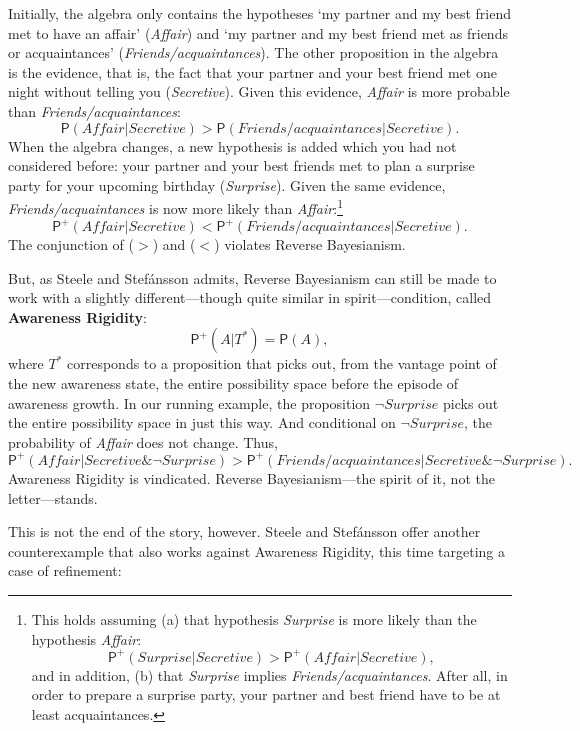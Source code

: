 \documentclass[
  11pt,
  dvipsnames,enabledeprecatedfontcommands]{scrartcl}
\newcommand{\pr}[1]{\ensuremath{\mathsf{P}(#1)}}
\newcommand{\ppr}[2]{\ensuremath{\mathsf{P}^{#1}(#2)}}
\begin{document}
\noindent Initially, the algebra only contains the hypotheses `my
partner and my best friend met to have an affair' (\textit{Affair}) and
`my partner and my best friend met as friends or acquaintances'
(\textit{Friends/acquaintances}). The other proposition in the algebra
is the evidence, that is, the fact that your partner and your best
friend met one night without telling you (\textit{Secretive}). Given
this evidence, \textit{Affair} is more probable than
\textit{Friends/acquaintances}:
\[\pr{\textit{Affair} \vert  \textit{Secretive} }> \pr{\textit{Friends/acquaintances} \vert \textit{Secretive}} \tag{>}.\]
When the algebra changes, a new hypothesis is added which you had not
considered before: your partner and your best friends met to plan a
surprise party for your upcoming birthday (\textit{Surprise}). Given the
same evidence, \textit{Friends/acquaintances} is now more likely than
\textit{Affair}:\footnote{This holds assuming (a) that hypothesis
  \textit{Surprise} is more likely than the hypothesis \textit{Affair}:
  \[\ppr{+}{ \textit{Surprise} \vert \textit{Secretive}}> \ppr{+}{ \textit{Affair} \vert \textit{Secretive}},\]
  and in addition, (b) that \textit{Surprise} implies
  \textit{Friends/acquaintances}. After all, in order to prepare a
  surprise party, your partner and best friend have to be at least
  acquaintances.}
\[\ppr{+}{\textit{Affair} \vert  \textit{Secretive} } < \ppr{+}{\textit{Friends/acquaintances} \vert \textit{Secretive}}. \tag{<}\]
The conjunction of (\(>\)) and (\(<\)) violates Reverse Bayesianism.

But, as Steele and Stefánsson admits, Reverse Bayesianism can still be
made to work with a slightly different---though quite similar in
spirit---condition, called \textbf{Awareness Rigidity}:
\[\ppr{+}{A \vert T^*}=\pr{A},\] where \(T^*\) corresponds to a
proposition that picks out, from the vantage point of the new awareness
state, the entire possibility space before the episode of awareness
growth. In our running example, the proposition
\(\neg\textit{Surprise}\) picks out the entire possibility space in just
this way. And conditional on \(\neg\textit{Surprise}\), the probability
of \textit{Affair} does not change. Thus,
\[\ppr{+}{\textit{Affair} \vert  \textit{Secretive} \& \neg\textit{Surprise} } > \ppr{+}{\textit{Friends/acquaintances} \vert \textit{Secretive} \& \neg\textit{Surprise}}. \]
Awareness Rigidity is vindicated. Reverse Bayesianism---the spirit of
it, not the letter---stands.

This is not the end of the story, however. Steele and Stefánsson offer
another counterexample that also works against Awareness Rigidity, this
time targeting a case of refinement:
\end{document}
